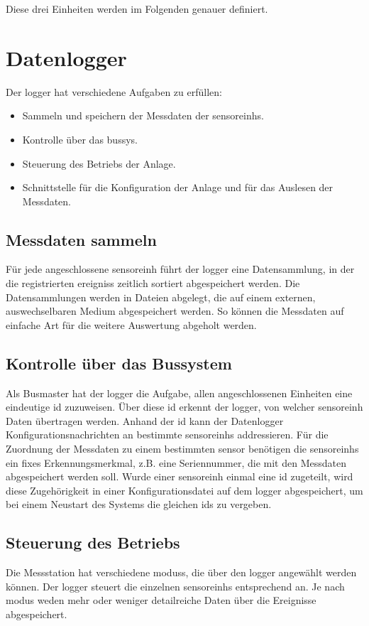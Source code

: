 Diese drei Einheiten werden im Folgenden genauer definiert.

\section{Datenlogger}
Der \gls{logger} hat verschiedene Aufgaben zu erfüllen:
\begin{itemize}
\item Sammeln und speichern der Messdaten der \glspl{sensoreinh}.
\item Kontrolle über das \gls{bussys}.
\item Steuerung des Betriebs der Anlage.
\item Schnittstelle für die Konfiguration der Anlage und für das Auslesen der Messdaten.
\end{itemize}


\subsection{Messdaten sammeln}
Für jede angeschlossene \gls{sensoreinh} führt der \gls{logger} eine Datensammlung, in der die registrierten \glspl{ereignis} zeitlich sortiert abgespeichert werden. Die Datensammlungen werden in Dateien abgelegt, die auf einem externen, auswechselbaren Medium abgespeichert werden. So können die Messdaten auf einfache Art für die weitere Auswertung abgeholt werden.


\subsection{Kontrolle über das Bussystem}
Als Busmaster hat der \gls{logger} die Aufgabe, allen angeschlossenen Einheiten eine eindeutige \gls{id} zuzuweisen. Über diese \gls{id} erkennt der \gls{logger}, von welcher \gls{sensoreinh} Daten übertragen werden. Anhand der \gls{id} kann der Datenlogger Konfigurationsnachrichten an bestimmte \glspl{sensoreinh} addressieren. Für die Zuordnung der Messdaten zu einem bestimmten \gls{sensor} benötigen die \glspl{sensoreinh} ein fixes Erkennungsmerkmal, z.B. eine Seriennummer, die mit den Messdaten abgespeichert werden soll. Wurde einer \gls{sensoreinh} einmal eine \gls{id} zugeteilt, wird diese Zugehörigkeit in einer Konfigurationsdatei auf dem \gls{logger} abgespeichert, um bei einem Neustart des Systems die gleichen \gls{id}s zu vergeben.


\subsection{Steuerung des Betriebs}
Die Messstation hat verschiedene \glspl{modus}, die über den \gls{logger} angewählt werden können. Der \gls{logger} steuert die einzelnen \glspl{sensoreinh} entsprechend an. Je nach \gls{modus} weden mehr oder weniger detailreiche Daten über die Ereignisse abgespeichert.



